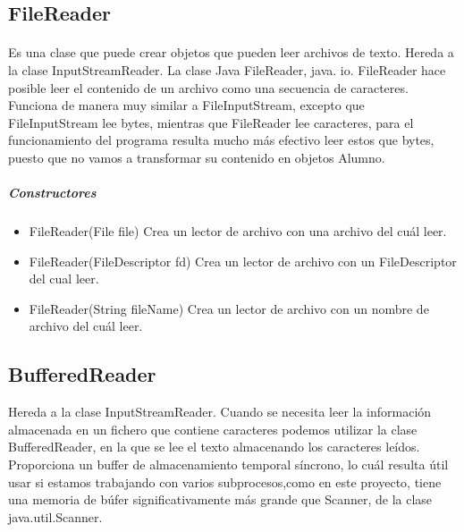 \documentclass[11pt]{article}
\begin{document}
\subsection{FileReader}
\paragraph{}
Es una clase que puede crear objetos que pueden leer archivos de texto. 
Hereda a la clase InputStreamReader. La clase Java FileReader, java. io. FileReader hace posible leer el contenido de un archivo como una secuencia de caracteres. Funciona de manera muy similar a FileInputStream, excepto que FileInputStream lee bytes, mientras que FileReader lee caracteres, para el funcionamiento del programa resulta mucho más efectivo leer estos que bytes, puesto que no vamos a transformar su contenido en objetos Alumno. 

\subparagraph{Constructores}
\begin{itemize}
\item FileReader(File file)
\quad Crea un lector de archivo con una archivo del cuál leer.
\item FileReader(FileDescriptor fd)
\quad Crea un lector de archivo con un FileDescriptor del cual leer.
\item FileReader(String fileName)
\quad Crea un lector de archivo con un nombre de archivo del cuál leer.
\end{itemize}

\subsection{BufferedReader}
Hereda a la clase InputStreamReader. Cuando se necesita leer la información almacenada en un fichero que contiene caracteres podemos utilizar la clase BufferedReader, en la que se lee el texto almacenando los caracteres leídos. Proporciona un buffer de almacenamiento temporal síncrono, lo cuál resulta útil usar si estamos trabajando con varios subprocesos,como en este proyecto, tiene una memoria de búfer significativamente más grande que Scanner, de la clase java.util.Scanner.
\end{document}
